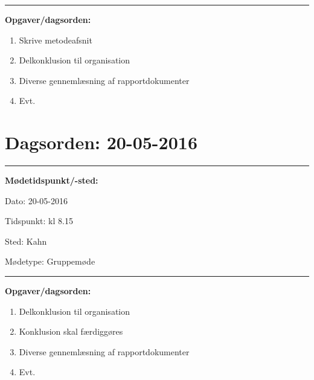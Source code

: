 \hrule
\textbf{Opgaver/dagsorden:} \newline
\begin{enumerate}
	\item Skrive metodeafsnit
	\item Delkonklusion til organisation
	\item Diverse gennemlæsning af rapportdokumenter
	\item Evt. 
\end{enumerate}

\newpage
\section{Dagsorden: 20-05-2016 }
\hrule
\textbf{Mødetidspunkt/-sted:} 

Dato: \tabto{7em} 20-05-2016

Tidspunkt: \tabto{7em} kl 8.15

Sted: \tabto{7em} Kahn 

Mødetype: \tabto{7em} Gruppemøde \newline


\hrule
\textbf{Opgaver/dagsorden:} \newline
\begin{enumerate}
	\item Delkonklusion til organisation
	\item Konklusion skal færdiggøres 
	\item Diverse gennemlæsning af rapportdokumenter
	\item Evt. 
\end{enumerate}